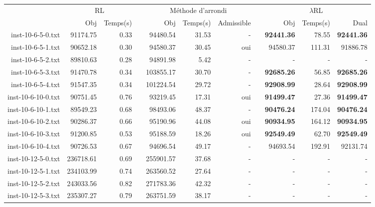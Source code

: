 \begin{landscape}

\begin{table}[h!]\centering
{}
\begin{tabular}{@{}rrrcrrrcrrr@{}}\toprule
& \multicolumn{2}{c}{RL} & \phantom{abc} & \multicolumn{3}{c}{Méthode d'arrondi} & \phantom{abc} & \multicolumn{3}{c}{$\lambda$RL}\\
\cmidrule{2-3} \cmidrule{5-7} \cmidrule{9-11}
& Obj & Temps(s) & & Obj & Temps(s) & Admissible & & Obj & Temps(s) & Dual\\ \midrule

inst-10-6-5-0.txt & 91174.75 & 0.33 & & 94480.54 & 31.53 & - & & \textbf{92441.36} & 78.55 & \textbf{92441.36} \\
inst-10-6-5-1.txt & 90652.18 & 0.30 & & 94580.37 & 30.45 & oui & & 94580.37 & 111.31 & 91886.78 \\
inst-10-6-5-2.txt & 89810.63 & 0.28 & & 94891.98 & 5.42 & - & & - & - & -  \\
inst-10-6-5-3.txt & 91470.78 & 0.34 & & 103855.17 & 30.70 & - & & \textbf{92685.26} & 56.85 & \textbf{92685.26} \\
inst-10-6-5-4.txt & 91547.35 & 0.34 & & 101224.54 & 29.72 & - & & \textbf{92908.99} & 28.64 & \textbf{92908.99} \\
inst-10-6-10-0.txt & 90751.45 & 0.76 & & 93219.45 & 17.31 & oui & & \textbf{91499.47} & 27.36 & \textbf{91499.47} \\
inst-10-6-10-1.txt & 89549.23 & 0.68 & & 98493.06 & 48.37 & - & & \textbf{90476.24} & 174.04 & \textbf{90476.24} \\
inst-10-6-10-2.txt & 90286.37 & 0.66 & & 95190.96 & 44.08 & oui & & \textbf{90934.95} & 164.12 & \textbf{90934.95} \\
inst-10-6-10-3.txt & 91200.85 & 0.53 & & 95188.59 & 18.26 & oui & & \textbf{92549.49} & 62.70 & \textbf{92549.49} \\
inst-10-6-10-4.txt & 90726.53 & 0.67 & & 94696.54 & 49.17 & - & & 94693.54 & 192.91 & 92131.74 \\
inst-10-12-5-0.txt & 236718.61 & 0.69 & & 255901.57 & 37.68 & - & & - & - & - \\
inst-10-12-5-1.txt & 234103.99 & 0.74 & & 263560.52 & 27.64 & - & & - & - & - \\
inst-10-12-5-2.txt & 243033.56 & 0.82 & & 271783.36 & 42.32 & - & & - & - & - \\
inst-10-12-5-3.txt & 235307.27 & 0.79 & & 263751.59 & 38.17 & - & & - & - & - \\

\end{tabular}
\end{table}
\end{landscape}
